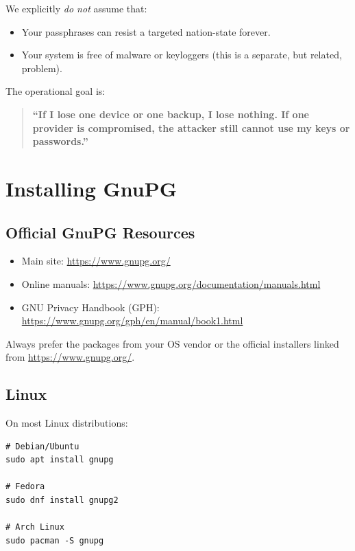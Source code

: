 \documentclass[11pt,a4paper]{article}
\begin{document}
We explicitly \emph{do not} assume that:

\begin{itemize}[noitemsep]
  \item Your passphrases can resist a targeted nation-state forever.
  \item Your system is free of malware or keyloggers (this is a separate, but related, problem).
\end{itemize}

The operational goal is:

\begin{quote}
  \textbf{``If I lose one device or one backup, I lose nothing. If one provider is compromised, the attacker still cannot use my keys or passwords.''}
\end{quote}

\section{Installing GnuPG}

\subsection{Official GnuPG Resources}

\begin{itemize}[noitemsep]
  \item Main site: \url{https://www.gnupg.org/}
  \item Online manuals: \url{https://www.gnupg.org/documentation/manuals.html}
  \item GNU Privacy Handbook (GPH): \url{https://www.gnupg.org/gph/en/manual/book1.html}
\end{itemize}

Always prefer the packages from your OS vendor or the official installers linked from \url{https://www.gnupg.org/}.

\subsection{Linux}

On most Linux distributions:

\begin{verbatim}
# Debian/Ubuntu
sudo apt install gnupg

# Fedora
sudo dnf install gnupg2

# Arch Linux
sudo pacman -S gnupg
\end{verbatim}
\end{document}
